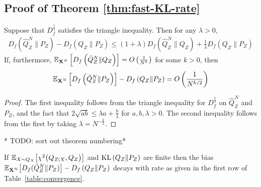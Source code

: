 \subsection{Proof of Theorem \ref{thm:fast-KL-rate}}\label{appendix:subsec:thm1}

\begin{lemma}\label{lemma:hilbertian-triangle}
Suppose that $D_f^{\frac{1}{2}}$ satisfies the triangle inequality.
Then for any $\lambda>0$,
\begin{align*}
    D_f\left(\hat{Q}^N_Z \| P_Z\right) - D_f\left(Q_{Z} \| P_Z\right) \leq (1+\lambda) D_f\left(\hat{Q}^N_Z \| Q_Z \right) +  \frac{1}{\lambda} D_f\left(Q_{Z} \| P_Z \right)
\end{align*}
If, furthermore, $\mathbb{E}_{\mathbf{X}^N}\left[ D_f\left(\hat{Q}^N_Z \| Q_Z\right)\right] = O\left( \frac{1}{N^k} \right)$ 
for some $k>0$, 
then
\begin{align*}
    \mathbb{E}_{\mathbf{X}^N}\left[ D_f\left(\hat{Q}^N_Z \| P_Z\right) \right] - D_f\left(Q_{Z} \| P_Z\right) = O\left( \frac{1}{N^{k/2}} \right)
\end{align*}
\end{lemma}
\begin{proof}
The first inequality follows from the triangle inequality for $D_f^{\frac{1}{2}}$ on $\hat{Q}^N_Z$ and $P_Z$, and the fact that $2\sqrt{ab} \leq \lambda a + \frac{b}{\lambda}$ for ${a, b, \lambda>0}$.
The second inequality follows from the first by taking $\lambda = N^{-\frac{k}{2}}$.
\end{proof}


* TODO: sort out theorem numbering* 
\begin{theorem}
If
$\mathbb{E}_{X\sim Q_X}\bigl[\chi^2\bigl(Q_{Z|X}, Q_Z\bigr)\bigr]$ and
$\mathrm{KL}\left( Q_{Z} \| P_Z\right)$ are finite then the bias ${\mathbb{E}_{\mathbf{X}^N}\bigl[D_f( \hat{Q}_Z^N \| P_Z)\bigr] - D_f\left( Q_{Z} \| P_Z\right)}$ decays with rate as given in the first row of Table~\ref{table:convergence}.
\end{theorem}

